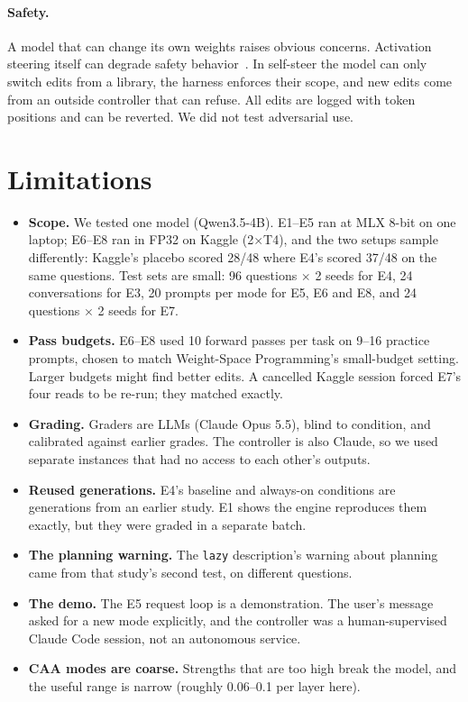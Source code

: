 \paragraph{Safety.} A model that can change its own weights raises obvious concerns. Activation steering itself can degrade safety behavior~\cite{roguescalpel2025}. In self-steer the model can only switch edits from a library, the harness enforces their scope, and new edits come from an outside controller that can refuse. All edits are logged with token positions and can be reverted. We did not test adversarial use.

\section{Limitations}
\begin{itemize}
\item \textbf{Scope.} We tested one model (Qwen3.5-4B). E1--E5 ran at MLX 8-bit on one laptop; E6--E8 ran in FP32 on Kaggle (2$\times$T4), and the two setups sample differently: Kaggle's placebo scored 28/48 where E4's scored 37/48 on the same questions. Test sets are small: 96 questions $\times$ 2 seeds for E4, 24 conversations for E3, 20 prompts per mode for E5, E6 and E8, and 24 questions $\times$ 2 seeds for E7.
\item \textbf{Pass budgets.} E6--E8 used 10 forward passes per task on 9--16 practice prompts, chosen to match Weight-Space Programming's small-budget setting. Larger budgets might find better edits. A cancelled Kaggle session forced E7's four reads to be re-run; they matched exactly.
\item \textbf{Grading.} Graders are LLMs (Claude Opus 5.5), blind to condition, and calibrated against earlier grades. The controller is also Claude, so we used separate instances that had no access to each other's outputs.
\item \textbf{Reused generations.} E4's baseline and always-on conditions are generations from an earlier study. E1 shows the engine reproduces them exactly, but they were graded in a separate batch.
\item \textbf{The planning warning.} The \texttt{lazy} description's warning about planning came from that study's second test, on different questions.
\item \textbf{The demo.} The E5 request loop is a demonstration. The user's message asked for a new mode explicitly, and the controller was a human-supervised Claude Code session, not an autonomous service.
\item \textbf{CAA modes are coarse.} Strengths that are too high break the model, and the useful range is narrow (roughly 0.06--0.1 per layer here).
\end{itemize}

